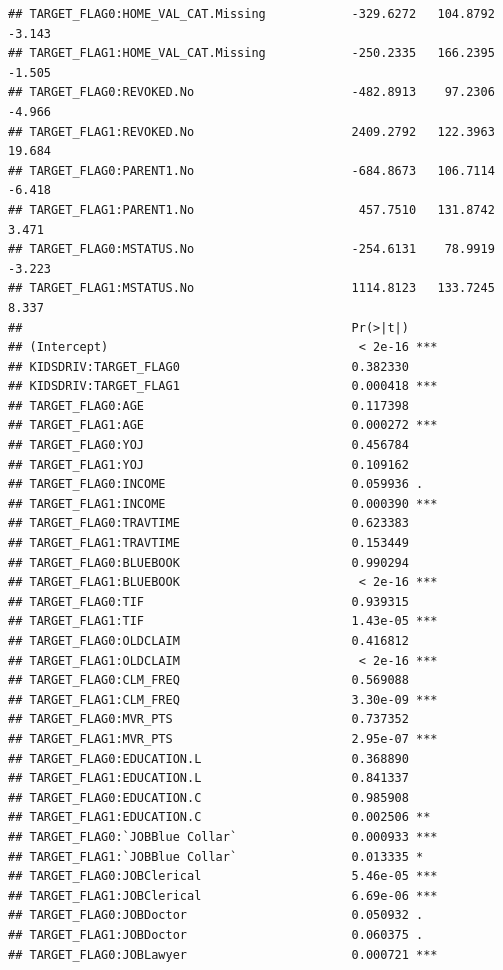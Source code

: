 \documentclass[
]{article}
\begin{document}
\begin{verbatim}
## TARGET_FLAG0:HOME_VAL_CAT.Missing            -329.6272   104.8792  -3.143
## TARGET_FLAG1:HOME_VAL_CAT.Missing            -250.2335   166.2395  -1.505
## TARGET_FLAG0:REVOKED.No                      -482.8913    97.2306  -4.966
## TARGET_FLAG1:REVOKED.No                      2409.2792   122.3963  19.684
## TARGET_FLAG0:PARENT1.No                      -684.8673   106.7114  -6.418
## TARGET_FLAG1:PARENT1.No                       457.7510   131.8742   3.471
## TARGET_FLAG0:MSTATUS.No                      -254.6131    78.9919  -3.223
## TARGET_FLAG1:MSTATUS.No                      1114.8123   133.7245   8.337
##                                              Pr(>|t|)    
## (Intercept)                                   < 2e-16 ***
## KIDSDRIV:TARGET_FLAG0                        0.382330    
## KIDSDRIV:TARGET_FLAG1                        0.000418 ***
## TARGET_FLAG0:AGE                             0.117398    
## TARGET_FLAG1:AGE                             0.000272 ***
## TARGET_FLAG0:YOJ                             0.456784    
## TARGET_FLAG1:YOJ                             0.109162    
## TARGET_FLAG0:INCOME                          0.059936 .  
## TARGET_FLAG1:INCOME                          0.000390 ***
## TARGET_FLAG0:TRAVTIME                        0.623383    
## TARGET_FLAG1:TRAVTIME                        0.153449    
## TARGET_FLAG0:BLUEBOOK                        0.990294    
## TARGET_FLAG1:BLUEBOOK                         < 2e-16 ***
## TARGET_FLAG0:TIF                             0.939315    
## TARGET_FLAG1:TIF                             1.43e-05 ***
## TARGET_FLAG0:OLDCLAIM                        0.416812    
## TARGET_FLAG1:OLDCLAIM                         < 2e-16 ***
## TARGET_FLAG0:CLM_FREQ                        0.569088    
## TARGET_FLAG1:CLM_FREQ                        3.30e-09 ***
## TARGET_FLAG0:MVR_PTS                         0.737352    
## TARGET_FLAG1:MVR_PTS                         2.95e-07 ***
## TARGET_FLAG0:EDUCATION.L                     0.368890    
## TARGET_FLAG1:EDUCATION.L                     0.841337    
## TARGET_FLAG0:EDUCATION.C                     0.985908    
## TARGET_FLAG1:EDUCATION.C                     0.002506 ** 
## TARGET_FLAG0:`JOBBlue Collar`                0.000933 ***
## TARGET_FLAG1:`JOBBlue Collar`                0.013335 *  
## TARGET_FLAG0:JOBClerical                     5.46e-05 ***
## TARGET_FLAG1:JOBClerical                     6.69e-06 ***
## TARGET_FLAG0:JOBDoctor                       0.050932 .  
## TARGET_FLAG1:JOBDoctor                       0.060375 .  
## TARGET_FLAG0:JOBLawyer                       0.000721 ***

\end{verbatim}
\end{document}
